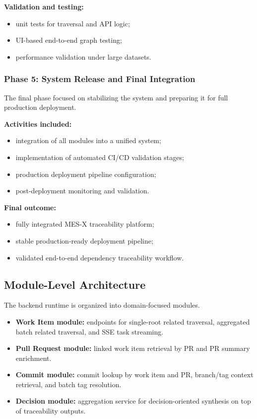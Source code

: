 \textbf{Validation and testing:}
\begin{itemize}
  \item unit tests for traversal and API logic;
  \item UI-based end-to-end graph testing;
  \item performance validation under large datasets.
\end{itemize}

\subsubsection{Phase 5: System Release and Final Integration}

The final phase focused on stabilizing the system and preparing it for full
production deployment.

\textbf{Activities included:}
\begin{itemize}
  \item integration of all modules into a unified system;
  \item implementation of automated CI/CD validation stages;
  \item production deployment pipeline configuration;
  \item post-deployment monitoring and validation.
\end{itemize}

\textbf{Final outcome:}
\begin{itemize}
  \item fully integrated MES-X traceability platform;
  \item stable production-ready deployment pipeline;
  \item validated end-to-end dependency traceability workflow.
\end{itemize}

\subsection{Module-Level Architecture}

The backend runtime is organized into domain-focused modules.

\begin{itemize}
  \item \textbf{Work Item module:} endpoints for single-root related traversal,
  aggregated batch related traversal, and SSE task streaming.
  \item \textbf{Pull Request module:} linked work item retrieval by PR and PR
  summary enrichment.
  \item \textbf{Commit module:} commit lookup by work item and PR, branch/tag
  context retrieval, and batch tag resolution.
  \item \textbf{Decision module:} aggregation service for decision-oriented
  synthesis on top of traceability outputs.
\end{itemize}


